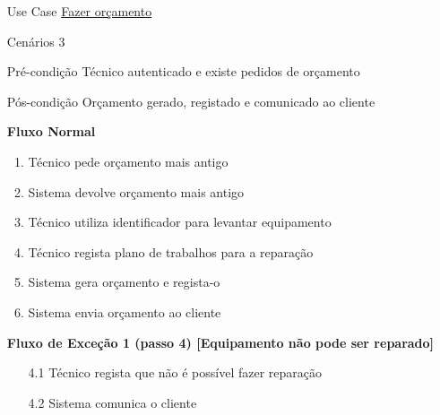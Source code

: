 \documentclass[../relatorio.tex]{subfiles}
\begin{document}
\begin{itemize}
    \item[Use Case] {\underline{Fazer orçamento}}
    \item[Cenários] {3}
    \item[Pré-condição] {Técnico autenticado e existe pedidos de orçamento}
    \item[Pós-condição] {Orçamento gerado, registado e comunicado ao cliente}
          \begin{flushleft}
              \textbf{Fluxo Normal}
          \end{flushleft}
          \begin{enumerate}
              \item Técnico pede orçamento mais antigo
              \item Sistema devolve orçamento mais antigo
              \item Técnico utiliza identificador para levantar equipamento
              \item Técnico regista plano de trabalhos para a reparação
              \item Sistema gera orçamento e regista-o
              \item Sistema envia orçamento ao cliente
          \end{enumerate}
          \begin{flushleft}
              \textbf{Fluxo de Exceção 1 (passo 4) [Equipamento não pode ser reparado]}
          \end{flushleft}
          \begin{itemize}
              \item[4.1] {Técnico regista que não é possível fazer reparação}
              \item[4.2] {Sistema comunica o cliente}
          \end{itemize}
\end{itemize}
\end{document}
